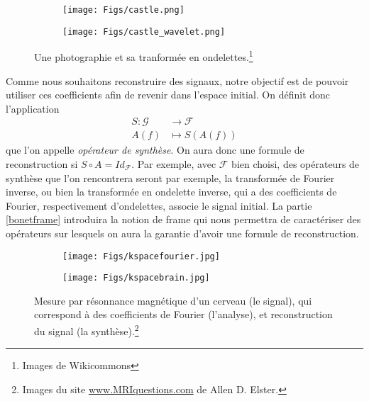 \begin{figure}[h]%
\centering
\begin{subfigure}{.5\textwidth}
  \centering
  \texttt{[image: Figs/castle.png]}
  \label{fig:sub1}
\end{subfigure}%
\begin{subfigure}{.5\textwidth}
  \centering
  \texttt{[image: Figs/castle\_wavelet.png]}
  \label{fig:sub2}
\end{subfigure}
	\caption{Une photographie et sa tranformée en ondelettes.\footnote{Images de Wikicommons}}
\label{fig:test}
\end{figure}
Comme nous souhaitons reconstruire des signaux, notre objectif est de pouvoir utiliser ces coefficients afin de revenir dans l'espace initial.
On définit donc l'application
\begin{align}
	S : \mathcal{G} &\longrightarrow \mathcal{F}\\
		A(f) &\longmapsto S(A(f))
\end{align}
que l'on appelle \emph{opérateur de synthèse}.
\newline
On aura donc une formule de reconstruction si $S \circ A = Id_{\mathcal{F}}$.
Par exemple, avec $\mathcal{F}$ bien choisi, des opérateurs de synthèse que l'on rencontrera seront par exemple, la transformée de Fourier inverse, ou bien la transformée en ondelette inverse, qui a des coefficients de Fourier, respectivement d'ondelettes, associe le signal initial.
La partie \ref{bonetframe} introduira la notion de frame qui nous permettra de caractériser des opérateurs sur lesquels on aura la garantie d'avoir une formule de reconstruction.

\begin{figure}[h]%
\centering
\begin{subfigure}{.5\textwidth}
  \centering
  \texttt{[image: Figs/kspacefourier.jpg]}
  \label{fig:sub1}
\end{subfigure}%
\begin{subfigure}{.5\textwidth}
  \centering
  \texttt{[image: Figs/kspacebrain.jpg]}
  \label{fig:sub2}
\end{subfigure}
	\caption{Mesure par résonnance magnétique d'un cerveau (le signal), qui correspond à des coefficients de Fourier (l'analyse), et reconstruction du signal (la synthèse).\footnote{Images du site \url{www.MRIquestions.com} de Allen D. Elster.} }
\label{fig:test}
\end{figure}

